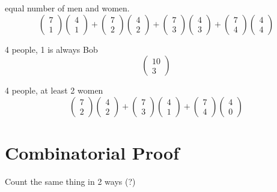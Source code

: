 \documentclass{report}
\begin{document}
equal number of men and women.
\[
\begin{pmatrix}7 \\ 1 \end{pmatrix}
\begin{pmatrix}4 \\ 1 \end{pmatrix}
+
\begin{pmatrix}7 \\ 2 \end{pmatrix}
\begin{pmatrix}4 \\ 2 \end{pmatrix}
+
\begin{pmatrix}7 \\ 3 \end{pmatrix}
\begin{pmatrix}4 \\ 3 \end{pmatrix}
+
\begin{pmatrix}7 \\ 4 \end{pmatrix}
\begin{pmatrix}4 \\ 4 \end{pmatrix}
\]

4 people, 1 is always Bob
\[
\begin{pmatrix} 10 \\ 3 \end{pmatrix}
\]

4 people, at least 2 women
\[
\begin{pmatrix}7 \\ 2 \end{pmatrix}
\begin{pmatrix}4 \\ 2 \end{pmatrix}
+
\begin{pmatrix}7 \\ 3 \end{pmatrix}
\begin{pmatrix}4 \\ 1 \end{pmatrix}
+
\begin{pmatrix}7 \\ 4 \end{pmatrix}
\begin{pmatrix}4 \\ 0 \end{pmatrix}
\]


\section{Combinatorial Proof}
Count the same thing in 2 ways (?)
\end{document}

